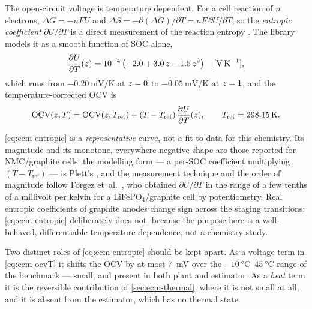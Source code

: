 The open-circuit voltage is temperature dependent. For a cell reaction of $n$ electrons,
$\Delta G = -nFU$ and $\Delta S = -\partial(\Delta G)/\partial T = nF\,\partial U/\partial T$, so
the \emph{entropic coefficient} $\partial U/\partial T$ is a direct measurement of the reaction
entropy \cite{newman2004,bernardi1985energy}. The library models it as a smooth function of SOC
alone,
\begin{equation}
\frac{\partial U}{\partial T}(z) = 10^{-4}\left(-2.0 + 3.0\,z - 1.5\,z^2\right)
 \quad[\si{\volt\per\kelvin}],
\label{eq:ecm-entropic}
\end{equation}
which runs from $\SI{-0.20}{\milli\volt\per\kelvin}$ at $z=0$ to
$\SI{-0.05}{\milli\volt\per\kelvin}$ at $z=1$, and the temperature-corrected OCV is
\begin{equation}
\mathrm{OCV}(z,T) = \mathrm{OCV}(z,T_{\mathrm{ref}}) + (T-T_{\mathrm{ref}})\,\frac{\partial U}{\partial T}(z),
\qquad T_{\mathrm{ref}} = \SI{298.15}{\kelvin}.
\label{eq:ecm-ocvT}
\end{equation}

\begin{remark}\label{rem:ecm-entropic}
\eqref{eq:ecm-entropic} is a \emph{representative} curve, not a fit to data for this chemistry.
Its magnitude and its monotone, everywhere-negative shape are those reported for NMC/graphite
cells; the modelling form --- a per-SOC coefficient multiplying $(T-T_{\mathrm{ref}})$ --- is
Plett's \cite[\S 2.9]{plett2015bms1}, and the measurement technique and the order of magnitude
follow Forgez et~al.~\cite{forgez2010thermal}, who obtained
$\partial U/\partial T$ in the range of a few tenths of a millivolt per kelvin for a
LiFePO$_4$/graphite cell by potentiometry. Real entropic coefficients of graphite anodes change
sign across the staging transitions; \eqref{eq:ecm-entropic} deliberately does not, because the
purpose here is a well-behaved, differentiable temperature dependence, not a chemistry study.
\end{remark}

Two distinct roles of \eqref{eq:ecm-entropic} should be kept apart. As a voltage term in
\eqref{eq:ecm-ocvT} it shifts the OCV by at most \SI{7}{\milli\volt} over the
$\SI{-10}{\celsius}$--$\SI{45}{\celsius}$ range of the benchmark --- small, and present in both
plant and estimator. As a \emph{heat} term it is the reversible contribution of
\cref{sec:ecm-thermal}, where it is not small at all, and it is absent from the estimator, which
has no thermal state.

